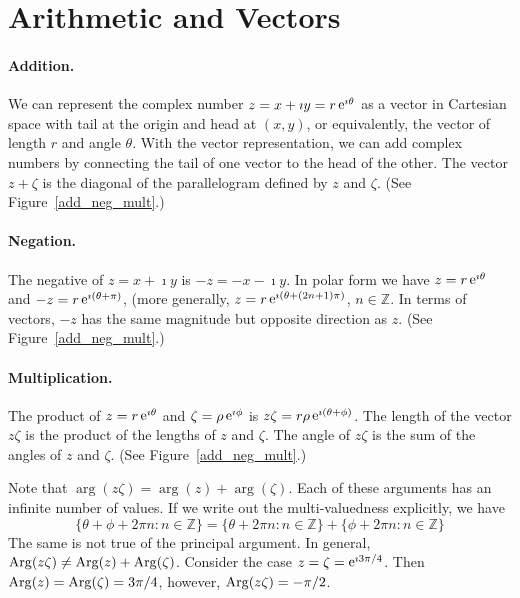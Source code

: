 \section{Arithmetic and Vectors}





\paragraph{Addition.}
We can represent the complex number $z = x + \imath y = r \mathop{\mathrm{e}}\nolimits^{\imath \theta}$ as 
a vector in Cartesian space with tail at the origin and head at 
$(x,y)$, or equivalently, the vector of length $r$ and angle $\theta$.
With the vector representation, we can add complex numbers by connecting
the tail of one vector to the head of the other.  The vector $z + \zeta$
is the diagonal of the parallelogram defined by $z$ and $\zeta$.
(See Figure~\ref{add_neg_mult}.)




\paragraph{Negation.}
The negative of $z = x + \imath y$ is $- z = - x - \imath y$.  In polar form we have
$z = r \mathop{\mathrm{e}}\nolimits^{\imath \theta}$ and $- z = r \mathop{\mathrm{e}}\nolimits^{\imath (\theta + \pi)}$, (more 
generally, $z = r \mathop{\mathrm{e}}\nolimits^{\imath (\theta + (2 n+1) \pi)}$, $n \in \mathbb{Z}$.
In terms of vectors, $- z$ has the same magnitude but opposite direction 
as $z$.  (See Figure~\ref{add_neg_mult}.)





\paragraph{Multiplication.}
The product of $z = r \mathop{\mathrm{e}}\nolimits^{\imath \theta}$ and $\zeta = \rho \mathop{\mathrm{e}}\nolimits^{\imath \phi}$ is
$z \zeta = r \rho \mathop{\mathrm{e}}\nolimits^{\imath (\theta + \phi)}$.  The length of the vector
$z \zeta$ is the product of the lengths of $z$ and $\zeta$.  The 
angle of $z \zeta$ is the sum of the angles of $z$ and $\zeta$.
(See Figure~\ref{add_neg_mult}.)

Note that $\arg(z \zeta) = \arg(z) + \arg(\zeta)$.  Each of these arguments
has an infinite number of values.  If we write out the multi-valuedness
explicitly, we have
\[
\{ \theta + \phi + 2 \pi n : n \in \mathbb{Z} \} =
\{ \theta + 2 \pi n : n \in \mathbb{Z} \}
+ \{ \phi + 2 \pi n : n \in \mathbb{Z} \}
\]
The same is not true of the principal argument.  In general,
$\mathop{\mathrm{Arg}}\nolimits(z \zeta) \neq \mathop{\mathrm{Arg}}\nolimits(z) + \mathop{\mathrm{Arg}}\nolimits(\zeta)$.  Consider the case 
$z = \zeta = \mathop{\mathrm{e}}\nolimits^{\imath 3 \pi / 4}$.  Then $\mathop{\mathrm{Arg}}\nolimits(z) = \mathop{\mathrm{Arg}}\nolimits(\zeta) = 3 \pi / 4$,
however, $\mathop{\mathrm{Arg}}\nolimits(z \zeta) = - \pi / 2$.

